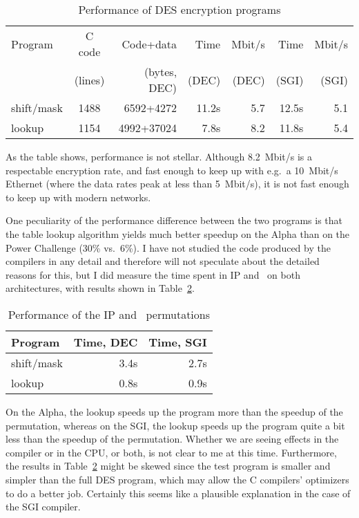 \begin{table}[hbtp]
\begin{center}
\begin{tabular}{|l|c|r|r|r|r|r|}
\hline
Program    & C code  & Code+data    & Time   & Mbit/s & Time  & Mbit/s \\
           & (lines) & (bytes, DEC) & (DEC)  & (DEC)  & (SGI) & (SGI) \\
\hline
shift/mask & 1488    & 6592+4272    & 11.2s & 5.7    & 12.5s & 5.1 \\
lookup     & 1154    & 4992+37024   &  7.8s & 8.2    & 11.8s & 5.4 \\
\hline
\end{tabular}
\end{center} 
\caption{Performance of DES encryption programs}
\label{tbl:perf}
\end{table}

As the table shows, performance is not stellar.  Although 8.2~Mbit/s is
a respectable encryption rate, and fast enough to keep up with e.g.~a
10~Mbit/s Ethernet (where the data rates peak at less than 5~Mbit/s), it
is not fast enough to keep up with modern networks.

One peculiarity of the performance difference between the two programs
is that the table lookup algorithm yields much better speedup on the
Alpha than on the Power Challenge (30\% vs.~6\%).  I have not studied
the code produced by the compilers in any detail and therefore will
not speculate about the detailed reasons for this, but I did measure the
time spent in IP and \ipinv\ on both architectures, with results shown in 
Table~\ref{tbl:ip}.

\begin{table}[hbtp]
\begin{center}
\begin{tabular}{|l|r|r|}
\hline
Program    & Time, DEC & Time, SGI \\
\hline
shift/mask &      3.4s &   2.7s \\
lookup     &      0.8s &   0.9s \\
\hline
\end{tabular}
\end{center}
\caption{Performance of the IP and \ipinv\ permutations}
\label{tbl:ip}
\end{table}

\noindent On the Alpha, the lookup speeds up the program more than the 
speedup of the permutation, whereas on the SGI, the lookup speeds up the
program quite a bit less than the speedup of the permutation.  Whether
we are seeing effects in the compiler or in the CPU, or both, is not
clear to me at this time.  Furthermore, the results in
Table~\ref{tbl:ip} might be skewed since the test program is smaller and
simpler than the full DES program, which may allow the C compilers'
optimizers to do a better job.  Certainly this seems like a plausible
explanation in the case of the SGI compiler.

